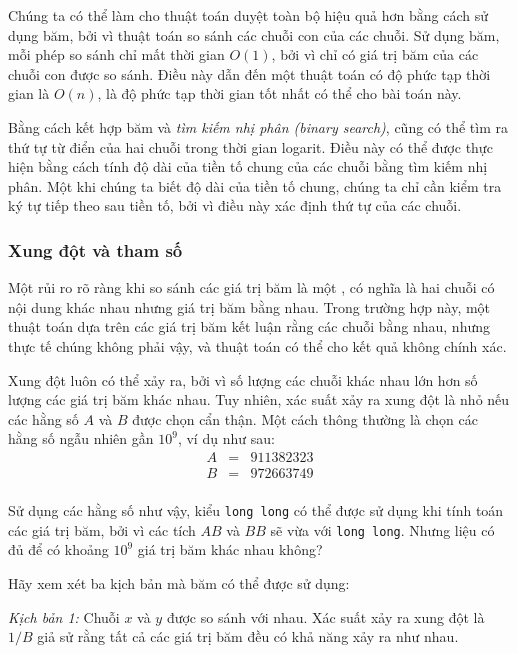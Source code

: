 Chúng ta có thể làm cho thuật toán duyệt toàn bộ hiệu quả hơn
bằng cách sử dụng băm, bởi vì thuật toán so sánh
các chuỗi con của các chuỗi.
Sử dụng băm, mỗi phép so sánh chỉ mất thời gian $O(1)$,
bởi vì chỉ có giá trị băm của các chuỗi con được so sánh.
Điều này dẫn đến một thuật toán có độ phức tạp thời gian là $O(n)$,
là độ phức tạp thời gian tốt nhất có thể cho bài toán này.

Bằng cách kết hợp băm và \emph{tìm kiếm nhị phân (binary search)},
cũng có thể tìm ra thứ tự từ điển của
hai chuỗi trong thời gian logarit.
Điều này có thể được thực hiện bằng cách tính độ dài
của tiền tố chung của các chuỗi bằng tìm kiếm nhị phân.
Một khi chúng ta biết độ dài của tiền tố chung,
chúng ta chỉ cần kiểm tra ký tự tiếp theo sau tiền tố,
bởi vì điều này xác định thứ tự của các chuỗi.

\subsubsection*{Xung đột và tham số}


Một rủi ro rõ ràng khi so sánh các giá trị băm là
một , có nghĩa là hai chuỗi có
nội dung khác nhau nhưng giá trị băm bằng nhau.
Trong trường hợp này, một thuật toán dựa trên
các giá trị băm kết luận rằng các chuỗi bằng nhau,
nhưng thực tế chúng không phải vậy,
và thuật toán có thể cho kết quả không chính xác.

Xung đột luôn có thể xảy ra,
bởi vì số lượng các chuỗi khác nhau lớn hơn
số lượng các giá trị băm khác nhau.
Tuy nhiên, xác suất xảy ra xung đột là nhỏ
nếu các hằng số $A$ và $B$ được chọn cẩn thận.
Một cách thông thường là chọn các hằng số ngẫu nhiên
gần $10^9$, ví dụ như sau:
\[
\begin{array}{lcl}
A & = & 911382323 \\
B & = & 972663749 \\
\end{array}
\]

Sử dụng các hằng số như vậy,
kiểu \texttt{long long} có thể được sử dụng
khi tính toán các giá trị băm,
bởi vì các tích $AB$ và $BB$ sẽ vừa với \texttt{long long}.
Nhưng liệu có đủ để có khoảng $10^9$ giá trị băm khác nhau không?

Hãy xem xét ba kịch bản mà băm có thể được sử dụng:

\textit{Kịch bản 1:} Chuỗi $x$ và $y$ được so sánh với
nhau.
Xác suất xảy ra xung đột là $1/B$ giả sử rằng
tất cả các giá trị băm đều có khả năng xảy ra như nhau.

